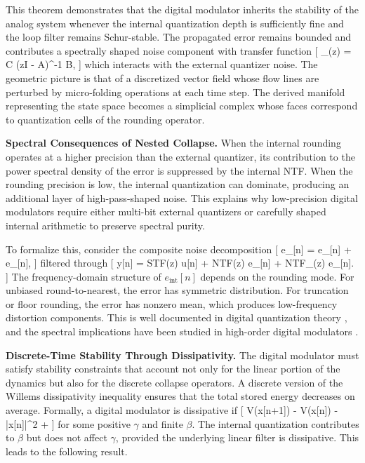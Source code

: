 \medskip

This theorem demonstrates that the digital modulator inherits the stability of the analog system whenever the internal quantization depth is sufficiently fine and the loop filter remains Schur-stable. The propagated error remains bounded and contributes a spectrally shaped noise component with transfer function
[
_{}(z) = C (zI - A)^{-1} B,
]
which interacts with the external quantizer noise. The geometric picture is that of a discretized vector field whose flow lines are perturbed by micro-folding operations at each time step. The derived manifold representing the state space becomes a simplicial complex whose faces correspond to quantization cells of the rounding operator.

\medskip

\textbf{Spectral Consequences of Nested Collapse.}
When the internal rounding operates at a higher precision than the external quantizer, its contribution to the power spectral density of the error is suppressed by the internal NTF. When the rounding precision is low, the internal quantization can dominate, producing an additional layer of high-pass-shaped noise. This explains why low-precision digital modulators require either multi-bit external quantizers or carefully shaped internal arithmetic to preserve spectral purity.

To formalize this, consider the composite noise decomposition
[
e_{}[n] = e_{}[n] + e_{}[n],
]
filtered through
[
y[n] = STF(z) u[n] + NTF(z) e_{}[n] + NTF_{}(z) e_{}[n].
]
The frequency-domain structure of $e_{\mathrm{int}}[n]$ depends on the rounding mode. For unbiased round-to-nearest, the error has symmetric distribution. For truncation or floor rounding, the error has nonzero mean, which produces low-frequency distortion components. This is well documented in digital quantization theory \cite{gershogray1991vectorquantization}, and the spectral implications have been studied in high-order digital modulators \cite{norsworthy1996deltasigma}.

\medskip

\textbf{Discrete-Time Stability Through Dissipativity.}
The digital modulator must satisfy stability constraints that account not only for the linear portion of the dynamics but also for the discrete collapse operators. A discrete version of the Willems dissipativity inequality \cite{willems1972dissipationI} ensures that the total stored energy decreases on average. Formally, a digital modulator is dissipative if
[
V(x[n+1]) - V(x[n]) \le -\gamma |x[n]|^{2} + \beta
]
for some positive $\gamma$ and finite $\beta$. The internal quantization contributes to $\beta$ but does not affect $\gamma$, provided the underlying linear filter is dissipative. This leads to the following result.

